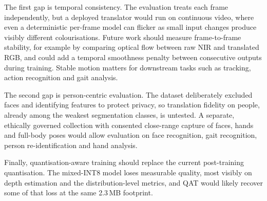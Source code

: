 The first gap is temporal consistency. The evaluation treats each frame independently, but a deployed translator would run on continuous video, where even a deterministic per-frame model can flicker as small input changes produce visibly different colourisations. Future work should measure frame-to-frame stability, for example by comparing optical flow between raw NIR and translated RGB, and could add a temporal smoothness penalty between consecutive outputs during training. Stable motion matters for downstream tasks such as tracking, action recognition and gait analysis.

The second gap is person-centric evaluation. The dataset deliberately excluded faces and identifying features to protect privacy, so translation fidelity on people, already among the weakest segmentation classes, is untested. A separate, ethically governed collection with consented close-range capture of faces, hands and full-body poses would allow evaluation on face recognition, gait recognition, person re-identification and hand analysis.

Finally, quantisation-aware training should replace the current post-training quantisation. The mixed-INT8 model loses measurable quality, most visibly on depth estimation and the distribution-level metrics, and QAT would likely recover some of that loss at the same 2.3\,MB footprint.
